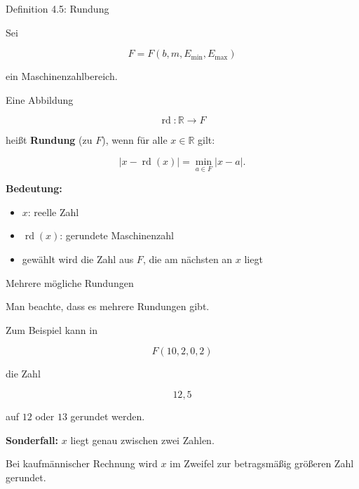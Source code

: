 \documentclass{beamer}
\begin{document}
\begin{frame}{Definition 4.5: Rundung}

\small

Sei

\[
F=F(b,m,E_{\min},E_{\max})
\]

ein Maschinenzahlbereich.

\vspace{0.4cm}

Eine Abbildung

\[
\operatorname{rd}:\mathbb{R}\to F
\]

heißt \textbf{Rundung} (zu \(F\)), wenn für alle \(x\in\mathbb{R}\) gilt:

\[
|x-\operatorname{rd}(x)|
=
\min_{a\in F}|x-a|.
\]

\vspace{0.6cm}

\textbf{Bedeutung:}

\begin{itemize}
\item \(x\): reelle Zahl
\item \(\operatorname{rd}(x)\): gerundete Maschinenzahl
\item gewählt wird die Zahl aus \(F\), die am nächsten an \(x\) liegt
\end{itemize}

\end{frame}

\begin{frame}{Mehrere mögliche Rundungen}

\small

Man beachte, dass es mehrere Rundungen gibt.

\vspace{0.2cm}

Zum Beispiel kann in

\[
F(10,2,0,2)
\]

die Zahl

\[
12{,}5
\]

auf \(12\) oder \(13\) gerundet werden.

\vspace{0.5cm}

\textbf{Sonderfall:} \(x\) liegt genau zwischen zwei Zahlen.

\vspace{0.4cm}

Bei kaufmännischer Rechnung wird \(x\) im Zweifel zur betragsmäßig größeren Zahl gerundet.

\end{frame}
\end{document}
